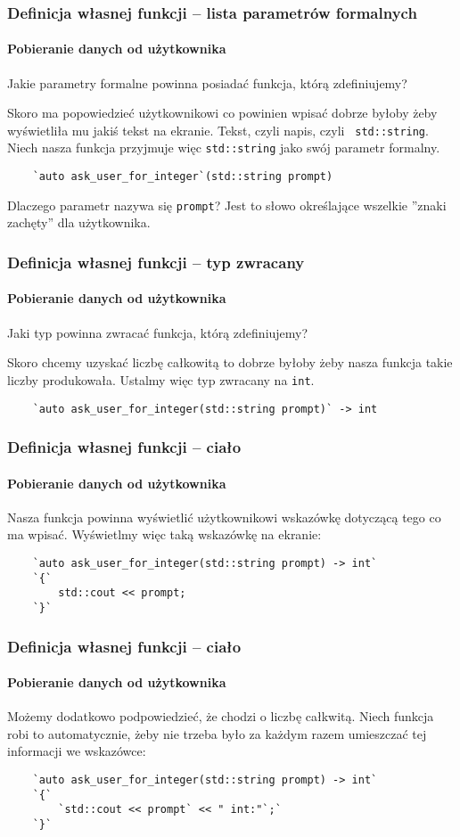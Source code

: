 \documentclass[aspectratio=169]{beamer}
\begin{document}
\begin{frame}[fragile]
    \frametitle{Definicja własnej funkcji -- lista parametrów formalnych}
    \framesubtitle{Pobieranie danych od użytkownika}

    Jakie parametry formalne powinna posiadać funkcja, którą zdefiniujemy?

    Skoro ma popowiedzieć użytkownikowi co powinien wpisać dobrze byłoby żeby
    wyświetliła mu jakiś tekst na ekranie. Tekst, czyli napis, czyli {\tt
    std::string}. Niech nasza funkcja przyjmuje więc {\tt std::string} jako swój
    parametr formalny.

    \begin{lstlisting}
    `auto ask_user_for_integer`(std::string prompt)
    \end{lstlisting}

    Dlaczego parametr nazywa się {\tt prompt}? Jest to słowo określające
    wszelkie ''znaki zachęty'' dla użytkownika.
\end{frame}

\begin{frame}[fragile]
    \frametitle{Definicja własnej funkcji -- typ zwracany}
    \framesubtitle{Pobieranie danych od użytkownika}

    Jaki typ powinna zwracać funkcja, którą zdefiniujemy?

    Skoro chcemy uzyskać liczbę całkowitą to dobrze byłoby żeby nasza funkcja
    takie liczby produkowała. Ustalmy więc typ zwracany na {\tt int}.

    \begin{lstlisting}
    `auto ask_user_for_integer(std::string prompt)` -> int
    \end{lstlisting}
\end{frame}

\begin{frame}[fragile]
    \frametitle{Definicja własnej funkcji -- ciało}
    \framesubtitle{Pobieranie danych od użytkownika}

    Nasza funkcja powinna wyświetlić użytkownikowi wskazówkę dotyczącą tego co
    ma wpisać. Wyświetlmy więc taką wskazówkę na ekranie:

    {\scriptsize
    \begin{lstlisting}
    `auto ask_user_for_integer(std::string prompt) -> int`
    `{`
        std::cout << prompt;
    `}`
    \end{lstlisting}}
\end{frame}

\begin{frame}[fragile]
    \frametitle{Definicja własnej funkcji -- ciało}
    \framesubtitle{Pobieranie danych od użytkownika}

    Możemy dodatkowo podpowiedzieć, że chodzi o liczbę całkwitą.
    Niech funkcja robi to automatycznie, żeby nie trzeba było za każdym razem
    umieszczać tej informacji we wskazówce:

    {\scriptsize
    \begin{lstlisting}
    `auto ask_user_for_integer(std::string prompt) -> int`
    `{`
        `std::cout << prompt` << " int:"`;`
    `}`
    \end{lstlisting}}
\end{frame}
\end{document}
